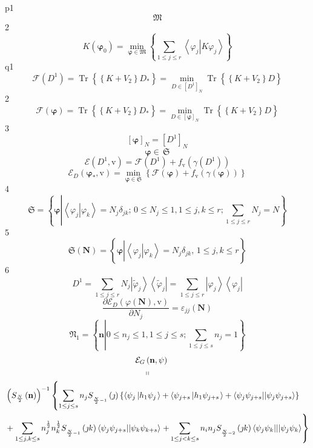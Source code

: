 \documentclass[aps,preprint]{revtex4}%
\begin{document}
p1%
\[
\mathfrak{M}%
\]
2%
\[
K\left(  \mathbf{\varphi}_{0}\right)  =\min_{\mathbf{\varphi\in}\mathfrak{M}%
}\left\{  \sum_{1\leq j\leq r}\left\langle \left.  \varphi_{j}\right\vert
K\varphi_{j}\right\rangle \right\}
\]
q1%
\[
\mathcal{F}\left(  D^{1}\right)  =\operatorname{Tr}\left\{  \overset
{}{\left\{  K+V_{2}\right\}  D_{\ast}}\right\}  =\min_{D\in\left[
D^{1}\right]  _{N}}\operatorname{Tr}\left\{  \overset{}{\left\{
K+V_{2}\right\}  D}\right\}
\]
2%
\[
\mathcal{F}\left(  \mathbf{\varphi}\right)  =\operatorname{Tr}\left\{
\overset{}{\left\{  K+V_{2}\right\}  D_{\ast}}\right\}  =\min_{D\in\left[
\mathbf{\varphi}\right]  _{N}}\operatorname{Tr}\left\{  \overset{}{\left\{
K+V_{2}\right\}  D}\right\}
\]
3%
\[
\left[  \mathbf{\varphi}\right]  _{N}=\left[  D^{1}\right]  _{N}%
\]%
\[
\mathbf{\varphi\in\,}\mathfrak{S}%
\]%
\[
\mathcal{E}\left(  D^{1}\mathbf{,}\mathrm{v}\right)  =\mathcal{F}\left(
D^{1}\right)  +f_{\mathrm{v}}\left(  \gamma\left(  D^{1}\right)  \right)
\]%
\[
\mathcal{E}_{D}\left(  \mathbf{\varphi}_{\ast}\mathbf{,}\mathrm{v}\right)
=\min_{\mathbf{\varphi\in}\mathfrak{S}}\left\{  \mathcal{F}\left(
\mathbf{\varphi}\right)  +f_{\mathrm{v}}\left(  \gamma\left(  \mathbf{\varphi
}\right)  \right)  \right\}
\]
4%
\[
\mathfrak{S}=\left\{  \mathbf{\varphi}\left\vert \left\langle \left.
\varphi_{j}\right\vert \varphi_{k}\right\rangle =N_{j}\delta_{jk};\,0\leq
N_{j}\leq1,1\leq j,k\leq r;\sum_{1\leq j\leq r}N_{j}=N\right.  \right\}
\]
5%
\[
\mathfrak{S}\left(  \mathbf{N}\right)  =\left\{  \mathbf{\varphi}\left\vert
\overset{}{\left\langle \left.  \varphi_{j}\right\vert \varphi_{k}%
\right\rangle =N_{j}\delta_{jk},\,1\leq j,k\leq r}\right.  \right\}
\]
6%
\[
D^{1}=\sum_{1\leq j\leq r}N_{j}\left\vert \tilde{\varphi}_{j}\right\rangle
\left\langle \tilde{\varphi}_{j}\right\vert =\sum_{1\leq j\leq r}\left\vert
\varphi_{j}\right\rangle \left\langle \varphi_{j}\right\vert
\]%
\[
\frac{\partial\mathcal{E}_{D}\left(  \varphi\mathbf{\left(  \mathbf{N}\right)
},\mathrm{v}\right)  }{\partial N_{j}}=\varepsilon_{jj}\left(  \mathbf{N}%
\right)
\]%
\[
\mathfrak{N}_{1}=\left\{  \mathbf{n}\left\vert 0\leq n_{j}\leq1,1\leq j\leq
s;\sum_{1\leq j\leq s}n_{j}=1\right.  \right\}
\]%
\begin{align*}
&  \qquad\qquad\qquad\qquad\qquad\qquad\qquad\qquad\mathcal{E}_{G}\left(
\mathbf{n,\psi}\right) \\
&  \qquad\qquad\qquad\qquad\qquad\qquad\qquad\qquad\quad\left.  \shortparallel
\right. \\
&  \left(  S_{\frac{N}{2}}\left(  \mathbf{n}\right)  \right)  ^{-1}\left\{
\sum_{1\leq j\leq s}n_{j}S_{_{\frac{N}{2}-1}}\left(  \jmath\right)  \left\{
\left\langle \psi_{j}\left\vert h_{1}\psi_{j}\right.  \right\rangle
+\left\langle \psi_{j+s}\left\vert h_{1}\psi_{j+s}\right.  \right\rangle
+\left\langle \psi_{j}\psi_{j+s}||\psi_{j}\psi_{j+s}\right\rangle \right\}
\right. \\
&  +\sum_{1\leq j,k\leq s}n_{j}^{\frac{1}{2}}n_{k}^{\frac{1}{2}}S_{_{\frac
{N}{2}-1}}\left(  \jmath k\right)  \left\langle \psi_{j}\psi_{j+s}||\psi
_{k}\psi_{k+s}\right\rangle \left.  +\sum_{1\leq j<k\leq s}n_{i}%
n_{j}S_{_{\frac{N}{2}-2}}\left(  \jmath k\right)  \left\langle \psi_{j}%
\psi_{k}|||\psi_{j}\psi_{k}\right\rangle \right\}
\end{align*}%
\end{document}
